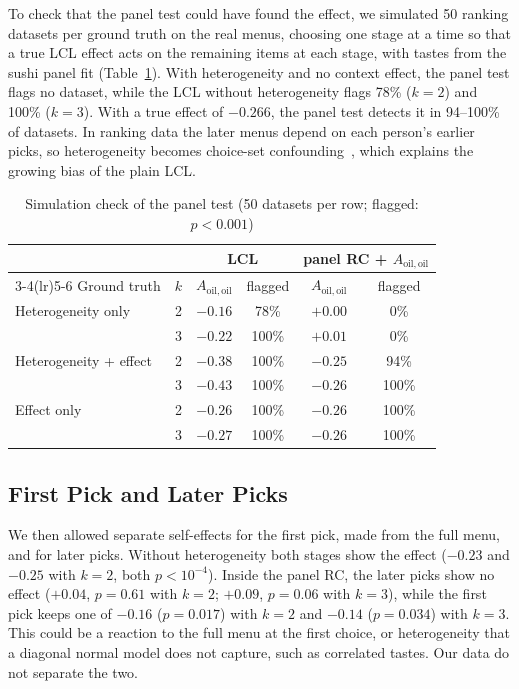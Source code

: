 \documentclass[11pt,journal,a4paper]{IEEEtran}
\newcommand{\Aoo}{A_{\mathrm{oil,oil}}}
\begin{document}
To check that the panel test could have found the effect, we simulated 50 ranking datasets per ground truth on
the real menus, choosing one stage at a time so that a true LCL effect acts on the remaining items at each
stage, with tastes from the sushi panel fit (Table~\ref{tab:panelcheck}). With heterogeneity and no context
effect, the panel test flags no dataset, while the LCL without heterogeneity flags 78\% ($k=2$) and 100\%
($k=3$). With a true effect of $-0.266$, the panel test detects it in 94--100\% of datasets. In ranking data
the later menus depend on each person's earlier picks, so heterogeneity becomes choice-set
confounding~\cite{tub21}, which explains the growing bias of the plain LCL.

\begin{table}[!t]
\caption{Simulation check of the panel test (50 datasets per row; flagged: $p<0.001$)}
\label{tab:panelcheck}
\centering\footnotesize
\setlength{\tabcolsep}{2.5pt}
\begin{tabular}{lccccc}
\toprule
 & & \multicolumn{2}{c}{LCL} & \multicolumn{2}{c}{panel RC + $\Aoo$} \\
\cmidrule(lr){3-4}\cmidrule(lr){5-6}
Ground truth & $k$ & $\Aoo$ & flagged & $\Aoo$ & flagged \\
\midrule
Heterogeneity only & 2 & $-0.16$ & 78\% & $+0.00$ & 0\% \\
 & 3 & $-0.22$ & 100\% & $+0.01$ & 0\% \\
Heterogeneity + effect & 2 & $-0.38$ & 100\% & $-0.25$ & 94\% \\
 & 3 & $-0.43$ & 100\% & $-0.26$ & 100\% \\
Effect only & 2 & $-0.26$ & 100\% & $-0.26$ & 100\% \\
 & 3 & $-0.27$ & 100\% & $-0.26$ & 100\% \\
\bottomrule
\end{tabular}
\end{table}

\subsection{First Pick and Later Picks}

We then allowed separate self-effects for the first pick, made from the full menu, and for later picks.
Without heterogeneity both stages show the effect ($-0.23$ and $-0.25$ with $k=2$, both $p<10^{-4}$). Inside
the panel RC, the later picks show no effect ($+0.04$, $p=0.61$ with $k=2$; $+0.09$, $p=0.06$ with $k=3$),
while the first pick keeps one of $-0.16$ ($p=0.017$) with $k=2$ and $-0.14$ ($p=0.034$) with $k=3$. This could
be a reaction to the full menu at the first choice, or heterogeneity that a diagonal normal model does not
capture, such as correlated tastes. Our data do not separate the two.
\end{document}
